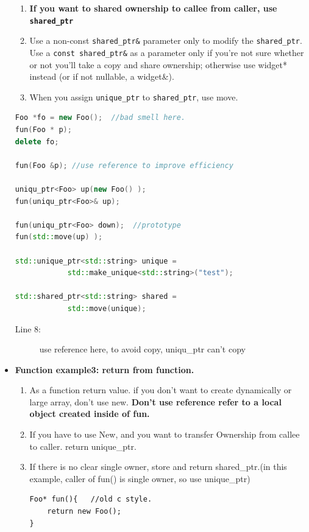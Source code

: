 \documentclass[a4paper,11pt,twoside]{book}
\begin{document}
\begin{itemize}
\begin{enumerate}
\item \textbf{If you want to shared ownership to callee from caller, use \texttt{shared\_ptr}}

\item Use a non-const \texttt{shared\_ptr\&} parameter only to modify the \texttt{shared\_ptr}. Use a \texttt{const shared\_ptr\&} as a parameter only if you're not sure whether or not you'll take a copy and share ownership; otherwise use widget* instead (or if not nullable, a widget\&).

\item When you assign \texttt{unique\_ptr} to \texttt{shared\_ptr}, use move.
\end{enumerate}

\begin{lstlisting}[frame=single, language=c++]
Foo *fo = new Foo();  //bad smell here.
fun(Foo * p);
delete fo;

fun(Foo &p); //use reference to improve efficiency

uniqu_ptr<Foo> up(new Foo() );
fun(uniqu_ptr<Foo>& up);

fun(uniqu_ptr<Foo> down);  //prototype
fun(std::move(up) );

std::unique_ptr<std::string> unique = 
			std::make_unique<std::string>("test");
			
std::shared_ptr<std::string> shared = 
			std::move(unique);
\end{lstlisting}
\begin{description}
	\item[Line 8:] use reference here, to avoid copy, uniqu\_ptr can't copy
\end{description}

\item \textbf{Function example3: return from function.}
\begin{enumerate}
\item As a function return value. if you don't want to create dynamically or large array, don't use new. \textbf{Don't  use reference refer to a local object created inside of fun.}

\item If you have to use New, and you want to transfer Ownership from callee to caller. return unique\_ptr.

\item If there is no clear single owner, store and return shared\_ptr.(in this example, caller of fun() is single owner, so use unique\_ptr)

\begin{lstlisting}[numbers=none]
Foo* fun(){   //old c style.
	return new Foo();
}


\end{lstlisting}
\end{enumerate}
\end{itemize}
\end{document}
